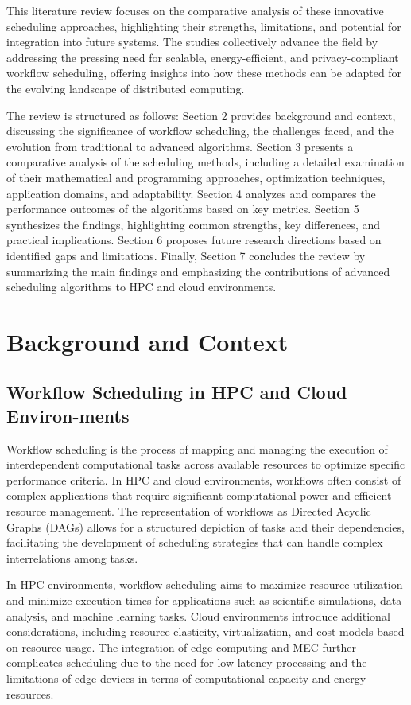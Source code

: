 \documentclass[a4paper, final]{article}
\begin{document}
This literature review focuses on the comparative analysis of these innovative scheduling approaches, highlighting 
their strengths, limitations, and potential for integration into future systems. The studies collectively advance the 
field by addressing the pressing need for scalable, energy-efficient, and privacy-compliant workflow scheduling, 
offering insights into how these methods can be adapted for the evolving landscape of distributed computing.

The review is structured as follows: Section 2 provides background and context, discussing the 
significance of workflow scheduling, the challenges faced, and the evolution from traditional to 
advanced algorithms. Section 3 presents a comparative analysis of the scheduling methods, including a 
detailed examination of their mathematical and programming approaches, optimization techniques, 
application domains, and adaptability. Section 4 analyzes and compares the performance outcomes of the 
algorithms based on key metrics. Section 5 synthesizes the findings, highlighting common strengths, key differences, and practical 
implications. Section 6 proposes future research directions based on identified gaps and limitations. Finally, Section 7 
concludes the review by summarizing the main findings and emphasizing the contributions of advanced scheduling algorithms 
to HPC and cloud environments.

\newpage
\section{Background and Context}
\subsection{Workflow Scheduling in HPC and Cloud Environ-ments}
Workflow scheduling is the process of mapping and managing the execution of interdependent computational tasks 
across available resources to optimize specific performance criteria. In HPC and cloud environments, workflows often 
consist of complex applications that require significant computational power and efficient resource management. The 
representation of workflows as Directed Acyclic Graphs (DAGs) allows for a structured depiction of tasks and their 
dependencies, facilitating the development of scheduling strategies that can handle complex interrelations among tasks.

In HPC environments, workflow scheduling aims to maximize resource utilization and minimize execution times for applications 
such as scientific simulations, data analysis, and machine learning tasks. Cloud environments introduce additional 
considerations, including resource elasticity, virtualization, and cost models based on resource usage. The integration 
of edge computing and MEC further complicates scheduling due to the need for low-latency processing and the limitations 
of edge devices in terms of computational capacity and energy resources.
\end{document}
